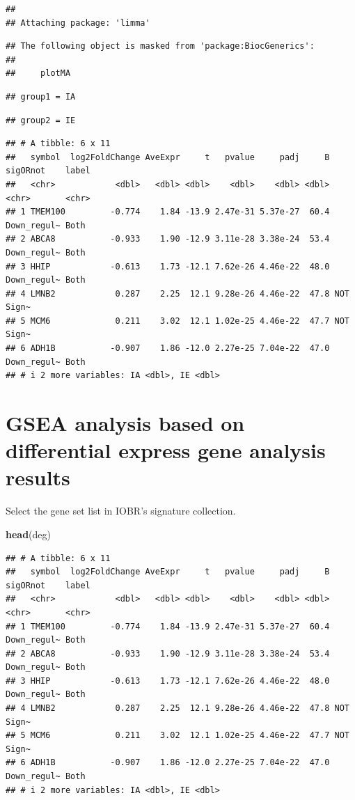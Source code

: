 \documentclass[
  12pt,
]{book}
\newenvironment{Shaded}{\begin{snugshade}}{\end{snugshade}}
\newcommand{\FunctionTok}[1]{\textcolor[rgb]{0.13,0.29,0.53}{\textbf{#1}}}
\newcommand{\NormalTok}[1]{#1}
\begin{document}
\begin{verbatim}
## 
## Attaching package: 'limma'
\end{verbatim}

\begin{verbatim}
## The following object is masked from 'package:BiocGenerics':
## 
##     plotMA
\end{verbatim}

\begin{verbatim}
## group1 = IA
\end{verbatim}

\begin{verbatim}
## group2 = IE
\end{verbatim}

\begin{verbatim}
## # A tibble: 6 x 11
##   symbol  log2FoldChange AveExpr     t   pvalue     padj     B sigORnot    label
##   <chr>            <dbl>   <dbl> <dbl>    <dbl>    <dbl> <dbl> <chr>       <chr>
## 1 TMEM100         -0.774    1.84 -13.9 2.47e-31 5.37e-27  60.4 Down_regul~ Both 
## 2 ABCA8           -0.933    1.90 -12.9 3.11e-28 3.38e-24  53.4 Down_regul~ Both 
## 3 HHIP            -0.613    1.73 -12.1 7.62e-26 4.46e-22  48.0 Down_regul~ Both 
## 4 LMNB2            0.287    2.25  12.1 9.28e-26 4.46e-22  47.8 NOT         Sign~
## 5 MCM6             0.211    3.02  12.1 1.02e-25 4.46e-22  47.7 NOT         Sign~
## 6 ADH1B           -0.907    1.86 -12.0 2.27e-25 7.04e-22  47.0 Down_regul~ Both 
## # i 2 more variables: IA <dbl>, IE <dbl>
\end{verbatim}

\hypertarget{gsea-analysis-based-on-differential-express-gene-analysis-results}{%
\section{GSEA analysis based on differential express gene analysis results}\label{gsea-analysis-based-on-differential-express-gene-analysis-results}}

Select the gene set list in IOBR's signature collection.

\begin{Shaded}
\begin{Highlighting}[]
\FunctionTok{head}\NormalTok{(deg)}
\end{Highlighting}
\end{Shaded}

\begin{verbatim}
## # A tibble: 6 x 11
##   symbol  log2FoldChange AveExpr     t   pvalue     padj     B sigORnot    label
##   <chr>            <dbl>   <dbl> <dbl>    <dbl>    <dbl> <dbl> <chr>       <chr>
## 1 TMEM100         -0.774    1.84 -13.9 2.47e-31 5.37e-27  60.4 Down_regul~ Both 
## 2 ABCA8           -0.933    1.90 -12.9 3.11e-28 3.38e-24  53.4 Down_regul~ Both 
## 3 HHIP            -0.613    1.73 -12.1 7.62e-26 4.46e-22  48.0 Down_regul~ Both 
## 4 LMNB2            0.287    2.25  12.1 9.28e-26 4.46e-22  47.8 NOT         Sign~
## 5 MCM6             0.211    3.02  12.1 1.02e-25 4.46e-22  47.7 NOT         Sign~
## 6 ADH1B           -0.907    1.86 -12.0 2.27e-25 7.04e-22  47.0 Down_regul~ Both 
## # i 2 more variables: IA <dbl>, IE <dbl>
\end{verbatim}
\end{document}
